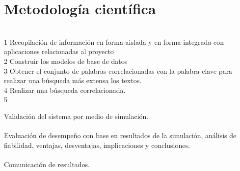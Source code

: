 \section {Metodología científica}
\ \\
1 Recopilación de información en forma aislada y en forma integrada con aplicaciones relacionadas al proyecto\\
2 Construir los modelos de base de datos\\
3 Obtener el conjunto de palabras correlacionadas con la palabra clave para realizar una búsqueda más extensa los textos.\\
4 Realizar una búsqueda correlacionada.\\
5 


Validación del sistema por medio de simulación.\\\\
Evaluación de desempeño con base en resultados de la simulación, análisis de fiabilidad, ventajas, desventajas, implicaciones y conclusiones.\\\\
Comunicación de resultados.